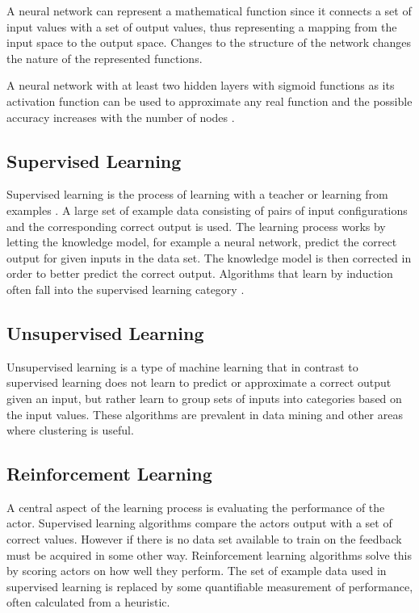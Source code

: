 A neural network can represent a mathematical function since it connects a set of input values with a set of output values, thus representing a mapping from the input space to the output space. Changes to the structure of the network changes the nature of the represented functions. 

A neural network with at least two hidden layers with sigmoid functions as its activation function can be used to approximate any real function and the possible accuracy increases with the number of nodes \cite{mitchel:approximation}.

\subsection{Supervised Learning}
Supervised learning is the process of learning with a teacher or learning from examples \cite{haykin:supervised}. A large set of example data consisting of pairs of input configurations and the corresponding correct output is used. The learning process works by letting the knowledge model, for example a neural network, predict the correct output for given inputs in the data set. The knowledge model is then corrected in order to better predict the correct output. Algorithms that learn by induction often fall into the supervised learning category \cite{glossary}.  

\subsection{Unsupervised Learning}
Unsupervised learning is a type of machine learning that in contrast to supervised learning does not learn to predict or approximate a correct output given an input, but rather learn to group sets of inputs into categories based on the input values. These algorithms are prevalent in data mining and other areas where clustering is useful. 

\subsection{Reinforcement Learning}
A central aspect of the learning process is evaluating the performance of the actor. Supervised learning algorithms compare the actors output with a set of correct values. However if there is no data set available to train on the feedback must be acquired in some other way. Reinforcement learning algorithms solve this by scoring actors on how well they perform. The set of example data used in supervised learning is replaced by some quantifiable measurement of performance, often calculated from a heuristic. 


